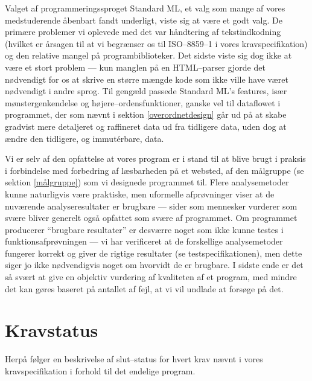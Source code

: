 \documentclass[a4paper,oneside]{memoir}
\begin{document}
Valget af programmeringssproget Standard ML, et valg som mange af
vores medstuderende åbenbart fandt underligt, viste sig at være et
godt valg. De primære problemer vi oplevede med det var håndtering af
tekstindkodning (hvilket er årsagen til at vi begrænser os til
ISO--8859--1 i vores kravspecifikation) og den relative mangel på
programbiblioteker. Det sidste viste sig dog ikke at være et stort
problem --- kun manglen på en HTML--parser gjorde det nødvendigt for os
at skrive en større mængde kode som ikke ville have været nødvendigt i
andre sprog. Til gengæld passede Standard ML's features, især
mønstergenkendelse og højere--ordensfunktioner, ganske vel til
dataflowet i programmet, der som nævnt i sektion
\ref{overordnetdesign} går ud på at skabe gradvist mere detaljeret og
raffineret data ud fra tidligere data, uden dog at ændre den
tidligere, og immutérbare, data.

Vi er selv af den opfattelse at vores program er i stand til at blive
brugt i praksis i forbindelse med forbedring af læsbarheden på et
websted, af den målgruppe (se sektion \ref{målgruppe}) som vi
designede programmet til. Flere analysemetoder kunne naturligvis være
praktiske, men uformelle afprøvninger viser at de nuværende
analyseresultater er brugbare --- sider som mennesker vurderer som
svære bliver generelt også opfattet som svære af programmet. Om
programmet producerer ``brugbare resultater'' er desværre noget som
ikke kunne testes i funktionsafprøvningen --- vi har verificeret at de
forskellige analysemetoder fungerer korrekt og giver de rigtige
resultater (se testspecifikationen), men dette siger jo ikke
nødvendigvis noget om hvorvidt de er brugbare. I sidste ende er det så
svært at give en objektiv vurdering af kvaliteten af et program, med
mindre det kan gøres baseret på antallet af fejl, at vi vil undlade at
forsøge på det.

\section{Kravstatus}
\label{kravstatus}
Herpå følger en beskrivelse af slut--status for hvert krav nævnt i
vores kravspecifikation i forhold til det endelige program.
\end{document}
